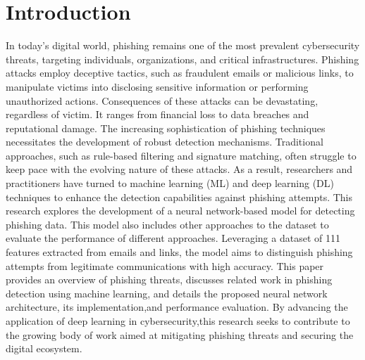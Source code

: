 \section{Introduction}

In today's digital world, phishing remains one of the most prevalent cybersecurity threats, targeting individuals,
organizations, and critical infrastructures. Phishing attacks employ deceptive tactics, such as fraudulent emails or
malicious links, to manipulate victims into disclosing sensitive information or performing unauthorized actions. Consequences
of these attacks can be devastating, regardless of victim. It ranges from financial loss to data breaches and reputational damage.
The increasing sophistication of phishing techniques necessitates the development of robust detection mechanisms.
Traditional approaches, such as rule-based filtering and signature matching, often struggle to keep pace with the
evolving nature of these attacks. As a result, researchers and practitioners have turned to machine learning (ML) and
deep learning (DL) techniques to enhance the detection capabilities against phishing attempts.
This research explores the development of a neural network-based model for detecting phishing data. This model also includes other
approaches to the dataset to evaluate the performance of different approaches.
Leveraging a dataset of 111 features extracted from emails and links, the model aims to distinguish phishing attempts
from legitimate communications with high accuracy. This paper provides an overview of phishing threats, discusses related
work in phishing detection using machine learning, and details the proposed neural network architecture,
its implementation,and performance evaluation. By advancing the application of deep learning in cybersecurity,this research seeks to contribute to the growing body of
work aimed at mitigating phishing threats and securing the digital ecosystem.